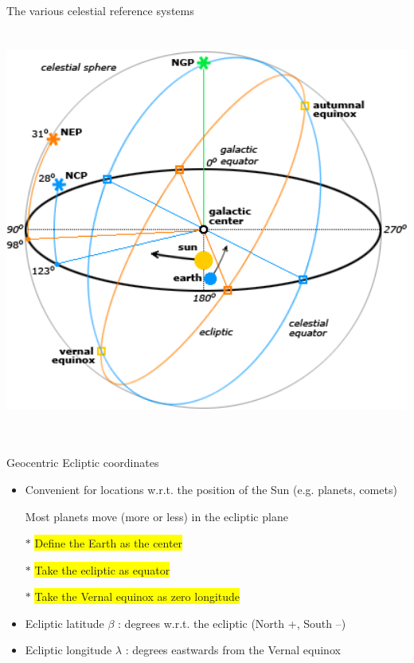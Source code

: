 \Tr
\onecolumn
\begin{center}
{\blue The various celestial reference systems}\\[3mm]
\includegraphics[keepaspectratio,height=14cm]{celestial-refs}
\end{center}

\Tr
\onecolumn
\begin{center}
{\red Geocentric Ecliptic coordinates}
\end{center}
%
\begin{itemize}
\item Convenient for locations w.r.t. the position of the Sun (e.g. planets, comets)
\item[] Most planets move (more or less) in the ecliptic plane
\item[$\ast$] \colorbox{yellow}{Define the Earth as the center}
\item[$\ast$] \colorbox{yellow}{Take the ecliptic as equator}
\item[$\ast$] \colorbox{yellow}{Take the Vernal equinox as zero longitude}
\item {\blue Ecliptic latitude $\beta$} : degrees w.r.t. the ecliptic (North +, South --)
\item {\blue Ecliptic longitude $\lambda$} : degrees eastwards from the Vernal equinox
\end{itemize}

